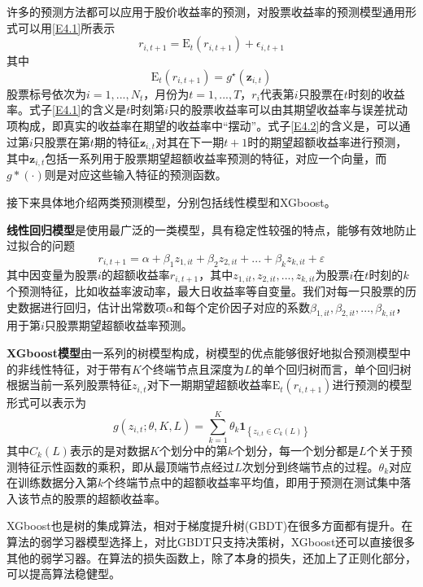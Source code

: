 \documentclass[12pt]{article} %
\begin{document}
	许多的预测方法都可以应用于股价收益率的预测，对股票收益率的预测模型通用形式可以用\eqref{E4.1}所表示
	\begin{equation}
		r_{i, t+1}=\mathrm{E}_{t}\left(r_{i, t+1}\right)+\epsilon_{i, t+1} \label{E4.1}
	\end{equation}
	其中
	\begin{equation}
		\mathrm{E}_{t}\left(r_{i, t+1}\right)=g^{\star}\left(\mathbf{z}_{i, t}\right) \label{E4.2}
	\end{equation}
	股票标号依次为$i=1,...,N_t$，月份为$t=1,...,T$，$r_{i}$代表第$i$只股票在$t$时刻的收益率。式子\eqref{E4.1}的含义是$t$时刻第$i$只的股票收益率可以由其期望收益率与误差扰动项构成，即真实的收益率在期望的收益率中“摆动”。式子\eqref{E4.2}的含义是，可以通过第$i$只股票在第$t$期的特征$\mathbf{z}_{i,t}$对其在下一期$t+1$时的期望超额收益率进行预测，其中$\mathbf{z}_{i,t}$包括一系列用于股票期望超额收益率预测的特征，对应一个向量，而$g*(\cdot)$则是对应这些输入特征的预测函数。
	
	接下来具体地介绍两类预测模型，分别包括线性模型和XGboost。
	
	\textbf{线性回归模型}是使用最广泛的一类模型，具有稳定性较强的特点，能够有效地防止过拟合的问题
	\begin{equation}
		r_{i,t+1}= \alpha + \beta_1 z_{1,it} + \beta_2 z_{2,it} +...+  \beta_k z_{k,it} +\varepsilon
	\end{equation}
	其中因变量为股票$i$的超额收益率$r_{i,t+1}$，其中$ z_{1,it},  z_{2,it},..., z_{k,it}$为股票$i$在$t$时刻的$k$个预测特征，比如收益率波动率，最大日收益率等自变量。我们对每一只股票的历史数据进行回归，估计出常数项$\alpha$和每个定价因子对应的系数$\beta_{1,it},$$\beta_{2,it},...,$$\beta_{k,it}$，用于第$i$只股票期望超额收益率预测。
	
	\textbf{XGboost模型}由一系列的树模型构成，树模型的优点能够很好地拟合预测模型中的非线性特征，对于带有$K$个终端节点且深度为$L$的单个回归树而言，单个回归树根据当前一系列股票特征$z_{i,t}$对下一期期望超额收益率$\mathrm{E}_t(r_{i,t+1})$进行预测的模型形式可以表示为
	\begin{equation}
		g\left(z_{i, t} ; \theta, K, L\right)=\sum_{k=1}^{K} \theta_{k} \mathbf{1}_{\left\{z_{i, t} \in C_{k}(L)\right\}}
	\end{equation}
	其中$C_k(L)$表示的是对数据$K$个划分中的第$k$个划分，每一个划分都是$L$个关于预测特征示性函数的乘积，即从最顶端节点经过$L$次划分到终端节点的过程。$\theta_{k}$对应在训练数据分入第$k$个终端节点中的超额收益率平均值，即用于预测在测试集中落入该节点的股票的超额收益率。
	
	XGboost也是树的集成算法，相对于梯度提升树(GBDT)在很多方面都有提升。在算法的弱学习器模型选择上，对比GBDT只支持决策树，XGboost还可以直接很多其他的弱学习器。在算法的损失函数上，除了本身的损失，还加上了正则化部分，可以提高算法稳健型。
	
\end{document}

